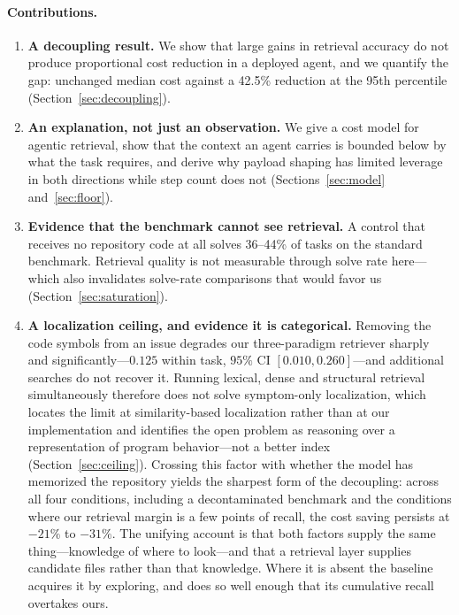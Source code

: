 \documentclass[11pt,letterpaper]{article}
\begin{document}
\paragraph{Contributions.}
\begin{enumerate}
\item \textbf{A decoupling result.} We show that large gains in retrieval accuracy
do not produce proportional cost reduction in a deployed agent, and we quantify
the gap: unchanged median cost against a 42.5\% reduction at the 95th percentile
(Section~\ref{sec:decoupling}).

\item \textbf{An explanation, not just an observation.} We give a cost model for
agentic retrieval, show that the context an agent carries is bounded below by
what the task requires, and derive why payload shaping has limited leverage in
both directions while step count does not (Sections~\ref{sec:model}
and~\ref{sec:floor}).

\item \textbf{Evidence that the benchmark cannot see retrieval.} A control that
receives no repository code at all solves 36--44\% of tasks on the standard
benchmark. Retrieval quality is not measurable through solve rate here---which
also invalidates solve-rate comparisons that would favor us
(Section~\ref{sec:saturation}).

\item \textbf{A localization ceiling, and evidence it is categorical.} Removing the
code symbols from an issue degrades our three-paradigm retriever sharply and
significantly---$0.125$ within task, $95\%$ CI $[0.010, 0.260]$---and additional
searches do not recover it. Running lexical, dense and structural retrieval
simultaneously therefore does not solve symptom-only localization, which locates the
limit at similarity-based localization rather than at our implementation and
identifies the open problem as reasoning over a representation of program
behavior---not a better index (Section~\ref{sec:ceiling}). Crossing this factor with
whether the model has memorized the repository yields the sharpest form of the
decoupling: across all four conditions, including a decontaminated benchmark and the
conditions where our retrieval margin is a few points of recall, the cost saving
persists at $-21\%$ to $-31\%$. The unifying account is that both factors
supply the same thing---knowledge of where to look---and that a retrieval layer
supplies candidate files rather than that knowledge. Where it is absent the baseline
acquires it by exploring, and does so well enough that its cumulative recall
overtakes ours.


\end{enumerate}
\end{document}
